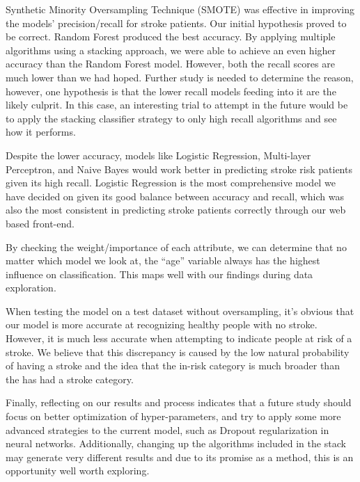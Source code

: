 \documentclass[11pt]{article}
\begin{document}
Synthetic Minority Oversampling Technique (SMOTE) was effective in improving the models’ precision/recall for stroke patients. Our initial hypothesis proved to be correct. Random Forest produced the best accuracy. By applying multiple algorithms using a stacking approach, we were able to achieve an even higher accuracy than the Random Forest model. However, both the recall scores are much lower than we had hoped. Further study is needed to determine the reason, however, one hypothesis is that the lower recall models feeding into it are the likely culprit. In this case, an interesting trial to attempt in the future would be to apply the stacking classifier strategy to only high recall algorithms and see how it performs.

\medskip

Despite the lower accuracy, models like Logistic Regression, Multi-layer Perceptron, and Naive Bayes would work better in predicting stroke risk patients given its high recall.
Logistic Regression is the most comprehensive model we have decided on given its good balance between accuracy and recall, which was also the most consistent in predicting stroke patients correctly through our web based front-end.

\medskip

By checking the weight/importance of each attribute, we can determine that no matter which model we look at, the “age” variable always has the highest influence on classification. This maps well with our findings during data exploration.

\medskip

When testing the model on a test dataset without oversampling, it’s obvious that our model is more accurate at recognizing healthy people with no stroke. However, it is much less accurate when attempting to indicate people at risk of a stroke.  We believe that this discrepancy is caused by the low natural probability of having a stroke and the idea that the in-risk category is much broader than the has had a stroke category.

\medskip

Finally, reflecting on our results and process indicates that a future study should focus on  better optimization of hyper-parameters, and try to apply some more advanced strategies to the current model, such as Dropout regularization in neural networks. Additionally, changing up the algorithms included in the stack may generate very different results and due to its promise as a method, this is an opportunity well worth exploring.
\end{document}
